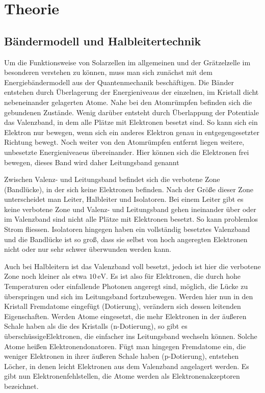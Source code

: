 \documentclass[11pt]{scrartcl}
\newcommand{\unit}[1]{\ensuremath{\,\mathrm{#1}}} %
\begin{document}
\section{Theorie}
\subsection{B\"andermodell und Halbleitertechnik}
Um die Funktionsweise von Solarzellen im allgemeinen und der Gr\"atzelzelle im besonderen verstehen zu k\"onnen, muss man sich zun\"achst mit dem Energieb\"andermodell aus der Quantenmechanik besch\"aftigen. Die B\"ander entstehen durch \"Uberlagerung der Energieniveaus der einzelnen, im Kristall dicht nebeneinander gelagerten Atome. Nahe bei den Atomr\"umpfen befinden sich die gebundenen Zust\"ande. Wenig dar\"uber entsteht durch \"Uberlappung der Potentiale das Valenzband, in dem alle Pl\"atze mit Elektronen besetzt sind. So kann sich ein Elektron nur bewegen, wenn sich ein anderes Elektron genau in entgegengesetzter Richtung bewegt. 
Noch weiter von den Atomr\"umpfen entfernt liegen weitere, unbesetzte Energieniveaeus \"ubereinander. Hier k\"onnen sich die Elektronen frei bewegen, dieses Band wird daher Leitungsband genannt

Zwischen Valenz- und Leitungsband befindet sich die verbotene Zone (Bandl\"ucke), in der sich keine Elektronen befinden. Nach der Gr\"o\ss{}e dieser Zone unterscheidet man Leiter, Halbleiter und Isolatoren. Bei einem Leiter gibt es keine verbotene Zone und Valenz- und Leitungsband gehen ineinander \"uber oder im Valenzband sind nicht alle Pl\"atze mit Elektronen besetzt. So kann problemlos Strom fliessen. Isolatoren hingegen haben ein vollst\"andig besetztes Valenzband und die Bandl\"ucke ist so gro\ss{}, dass sie selbst von hoch angeregten Elektronen nicht oder nur sehr schwer \"uberwunden werden kann.

Auch bei Halbleitern ist das Valenzband voll besetzt, jedoch ist hier die verbotene Zone noch kleiner als etwa $10\unit{eV}$. Es ist also f\"ur Elektronen, die durch hohe Temperaturen oder einfallende Photonen angeregt sind, m\"oglich, die L\"ucke zu \"uberspringen und sich im Leitungsband fortzubewegen. Werden hier nun in den Kristall Fremdatome eingef\"ugt (Dotierung), ver\"andern sich dessen leitenden Eigenschaften. Werden Atome eingesetzt, die mehr Elektronen in der \"au\ss{}eren Schale haben als die des Kristalls (n-Dotierung), so gibt es \glqq\"ubersch\"ussige\grqq Elektronen, die einfacher ins Leitungsband wechseln k\"onnen. Solche Atome hei\ss{}en Elektronendonatoren. F\"ugt man hingegen Fremdatome ein, die weniger Elektronen in ihrer \"au\ss{}eren Schale haben (p-Dotierung), entstehen L\"ocher, in denen leicht Elektronen aus dem Valenzband angelagert werden. Es gibt nun Elektronenfehlstellen, die Atome werden als Elektronenakzeptoren bezeichnet.
\end{document}

